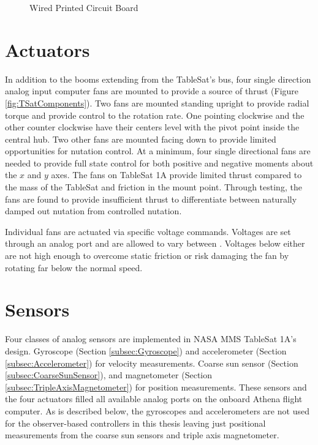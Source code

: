 \begin{figure}[ht]
  \centerline{}
  \caption{Wired Printed Circuit Board}
  \label{fig:WiredPCB}
\end{figure}


\section{Actuators}
\label{sec:Actuators}

In addition to the booms extending from the TableSat's bus, four single direction analog input computer fans are mounted to provide a source of thrust (Figure \ref{fig:TSatComponents}).  Two fans are mounted standing upright to provide radial torque and provide control to the rotation rate.  One pointing clockwise and the other counter clockwise have their centers level with the pivot point inside the central hub.  Two other fans are mounted facing down to provide limited opportunities for nutation control.  At a minimum, four single directional fans are needed to provide full state control for both positive and negative moments about the $x$ and $y$ axes.  The fans on TableSat 1A provide limited thrust compared to the mass of the TableSat and friction in the mount point.  Through testing, the fans are found to provide insufficient thrust to differentiate between naturally damped out nutation from controlled nutation.

Individual fans are actuated via specific voltage commands.  Voltages are set through an analog port and are allowed to vary between .  Voltages below  either are not high enough to overcome static friction or risk damaging the fan by rotating far below the normal speed.


\section{Sensors}
\label{sec:Sensors}

Four classes of analog sensors are implemented in NASA MMS TableSat 1A's design. Gyroscope (Section \ref{subsec:Gyroscope}) and accelerometer (Section \ref{subsec:Accelerometer}) for velocity measurements.  Coarse sun sensor (Section \ref{subsec:CoarseSunSensor}), and magnetometer (Section \ref{subsec:TripleAxisMagnetometer}) for position measurements.  These sensors and the four actuators filled all available analog ports on the onboard Athena flight computer.  As is described below, the gyroscopes and accelerometers are not used for the observer-based controllers in this thesis leaving just positional measurements from the coarse sun sensors and triple axis magnetometer.

